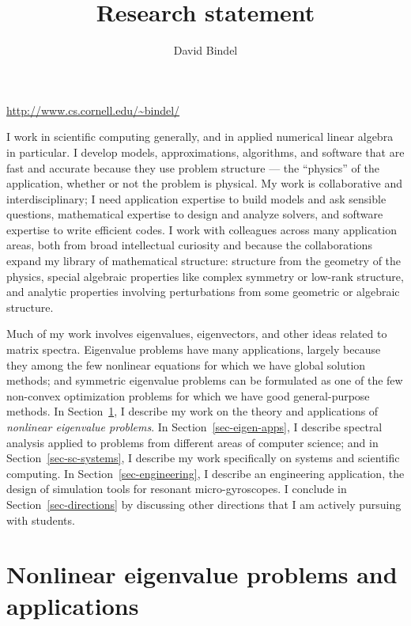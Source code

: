 \documentclass[11pt]{amsart}
\title{Research statement}
\author{David Bindel}
\begin{document}
\maketitle
\vspace{-5mm}
\begin{center}
\url{http://www.cs.cornell.edu/~bindel/}
\end{center}
\vspace{+5mm}

I work in scientific computing generally, and in
applied numerical linear algebra in particular.
%
I develop models, approximations, algorithms, and software that
are fast and accurate because they use problem structure --- the
``physics'' of the application, whether or not the problem is physical.
%
My work is collaborative and interdisciplinary; I need
application expertise to build models and ask sensible questions,
mathematical expertise to design and analyze solvers,
and software expertise to write efficient codes.
%
I work with colleagues across many application areas, both from
broad intellectual curiosity and because the collaborations
expand my library of mathematical structure:
%
structure from the geometry of the physics,
special algebraic properties like complex symmetry or
low-rank structure, and
analytic properties involving perturbations from some geometric or
algebraic structure.

Much of my work involves eigenvalues, eigenvectors, and other
ideas related to matrix spectra.
%
Eigenvalue problems have many applications, largely because they among
the few nonlinear equations for which we have global solution methods;
and symmetric eigenvalue problems can be formulated as one of the few
non-convex optimization problems for which we have good general-purpose
methods.
%
In Section~\ref{sec-nep}, I describe my work on the theory and
applications of {\em nonlinear eigenvalue problems}.
%
In Section~\ref{sec-eigen-apps}, I describe spectral analysis applied to
problems from different areas of computer science; and in
Section~\ref{sec-sc-systems}, I describe my work specifically on systems
and scientific computing. In Section~\ref{sec-engineering}, I describe
an engineering application, the design of simulation tools for
resonant micro-gyroscopes. I conclude in
Section~\ref{sec-directions} by discussing other directions
that I am actively pursuing with students.

\section{Nonlinear eigenvalue problems and applications}
\label{sec-nep}
\end{document}
